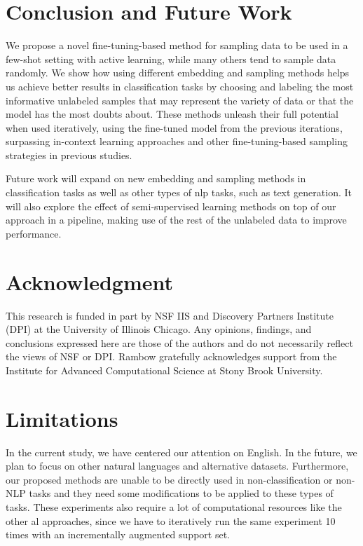 \documentclass[11pt]{article}
\theoremstyle{definition}
\begin{document}
\section{Conclusion and Future Work} \label{sec:conclusion_future_work}

We propose a novel fine-tuning-based method for sampling data to be used in a few-shot setting with active learning, while many others tend to sample data randomly. We show how using different embedding and sampling methods helps us achieve better results in classification tasks by choosing and labeling the most informative unlabeled samples that may represent the variety of data or that the model has the most doubts about.
These methods unleash their full potential when used iteratively, using the fine-tuned model from the previous iterations, surpassing in-context learning approaches and other fine-tuning-based sampling strategies in previous studies.

Future work will expand on new embedding and sampling methods in classification tasks as well as other types of \gls*{nlp} tasks, such as text generation.
It will also explore the effect of semi-supervised learning methods on top of our approach in a pipeline, making use of the rest of the unlabeled data to improve performance.


\section*{Acknowledgment}
This research is funded in part by NSF IIS and Discovery Partners Institute (DPI) at the University of Illinois Chicago. Any opinions, findings, and conclusions expressed here are those of the authors and do not necessarily reflect the views of NSF or DPI. 
Rambow gratefully acknowledges support from the Institute for Advanced Computational Science at Stony Brook University.

\section*{Limitations}

In the current study, we have centered our attention on English.
In the future, we plan to focus on other natural languages and alternative datasets.
Furthermore, our proposed methods are unable to be directly used in non-classification or non-NLP tasks and they need some modifications to be applied to these types of tasks.
These experiments also require a lot of computational resources like the other \gls*{al} approaches, since we have to iteratively run the same experiment 10 times with an incrementally augmented support set.
\end{document}
